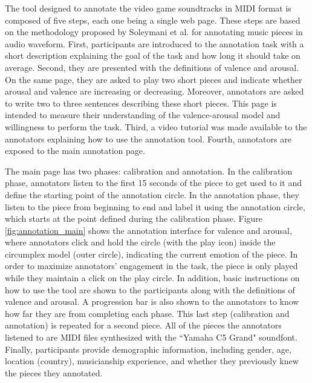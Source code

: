 The tool designed to annotate the video game soundtracks in MIDI format is composed of five steps, each one being a single web page. These steps are based on the methodology proposed by Soleymani et al. \cite{Soleymani_2013} for annotating music pieces in audio waveform. First, participants are introduced to the annotation task with a short description explaining the goal of the task and how long it should take on average. Second, they are presented with the definitions of valence and arousal. On the same page, they are asked to play two short pieces and indicate whether arousal and valence are increasing or decreasing. Moreover, annotators are asked to write two to three sentences describing these short pieces. This page is intended to measure their understanding of the valence-arousal model and willingness to perform the task. Third, a video tutorial was made available to the annotators explaining how to use the annotation tool. Fourth, annotators are exposed to the main annotation page.

The main page has two phases: calibration and annotation. In the calibration phase, annotators listen to the first 15 seconds of the piece to get used to it and define the starting point of the annotation circle. In the annotation phase, they listen to the piece from beginning to end and label it using the annotation circle, which starts at the point defined during the calibration phase. Figure \ref{fig:annotation_main} shows the annotation interface for valence and arousal, where annotators click and hold the circle (with the play icon) inside the circumplex model (outer circle), indicating the current emotion of the piece. In order to maximize annotators' engagement in the task, the piece is only played while they maintain a click on the play circle. In addition, basic instructions on how to use the tool are shown to the participants along with the definitions of valence and arousal. A progression bar is also shown to the annotators to know how far they are from completing each phase. This last step (calibration and annotation) is repeated for a second piece. All of the pieces the annotators listened to are MIDI files synthesized with the ``Yamaha C5 Grand" soundfont. Finally, participants provide demographic information, including gender, age, location (country), musicianship experience, and whether they previously knew the pieces they annotated.

